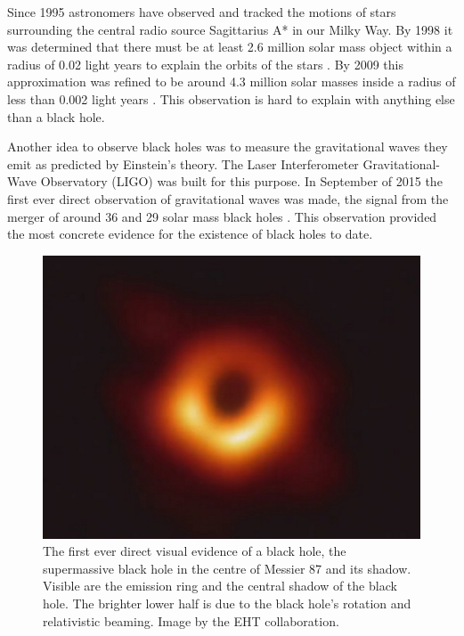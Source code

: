 \documentclass[english, oneside]{HYgradu}
\begin{document}
Since 1995 astronomers have observed and tracked the motions of stars surrounding the central radio source Sagittarius A* in our Milky Way. By 1998 it was determined that there must be at least 2.6 million solar mass object within a radius of 0.02 light years to explain the orbits of the stars \citep{ghez:1998}. By 2009 this approximation was refined to be around 4.3 million solar masses inside a radius of less than 0.002 light years \citep{gillessen:2009}. This observation is hard to explain with anything else than a black hole.

Another idea to observe black holes was to measure the gravitational waves they emit as predicted by Einstein's theory. The Laser Interferometer Gravitational-Wave Observatory (LIGO) was built for this purpose. In September of 2015 the first ever direct observation of gravitational waves was made, the signal from the merger of around 36 and 29 solar mass black holes \citep{abbott:2016}. This observation provided the most concrete evidence for the existence of black holes to date.

\begin{figure}[h!tb]
\centering
\includegraphics[width=\textwidth]{../images/blackhole.jpg}
\caption{The first ever direct visual evidence of a black hole, the supermassive black hole in the centre of Messier 87 and its shadow. Visible are the emission ring and the central shadow of the black hole. The brighter lower half is due to the black hole's rotation and relativistic beaming. Image by the EHT collaboration.}
\label{fig:BlackHole}
\end{figure}
\end{document}
